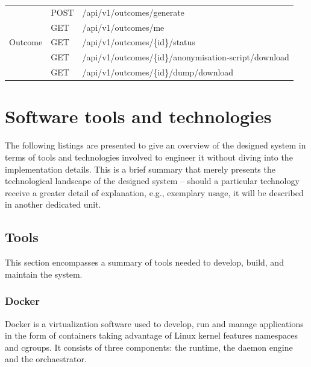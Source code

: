 \documentclass[a4paper,twoside,12pt]{book}
\begin{document}
\begin{table}[]
\begin{tabular}{|c|l|l|}
\multicolumn{1}{|c|}{\multirow{5}{*}{Outcome}}                     & \multicolumn{1}{l|}{POST}           & /api/v1/outcomes/generate  \\
\multicolumn{1}{|c|}{}                                             & \multicolumn{1}{l|}{GET}            & /api/v1/outcomes/me \\
\multicolumn{1}{|c|}{}                                             & \multicolumn{1}{l|}{GET}            & /api/v1/outcomes/\{id\}/status \\  
\multicolumn{1}{|c|}{}                                             & \multicolumn{1}{l|}{GET}            & \footnotesize /api/v1/outcomes/\{id\}/anonymisation-script/download \\ 
\multicolumn{1}{|c|}{}                                             & \multicolumn{1}{l|}{GET}            & /api/v1/outcomes/\{id\}/dump/download \\ \hline

\end{tabular}
\end{table}

\section{Software tools and technologies}

The following listings are presented to give an overview of the designed system in terms of tools and technologies involved to engineer it without diving into the implementation details. This is a brief summary that merely presents the technological landscape of the designed system – should a particular technology receive a greater detail of explanation, e.g., exemplary usage, it will be described in another dedicated unit.

\subsection{Tools}

This section encompasses a summary of tools needed to develop, build, and maintain the system.

\subsubsection{Docker}

Docker is a virtualization software used to develop, run and manage applications in the form of containers taking advantage of Linux kernel features namespaces and cgroups. It consists of three components: the runtime, the daemon engine and the orchaestrator. 
\end{document}
